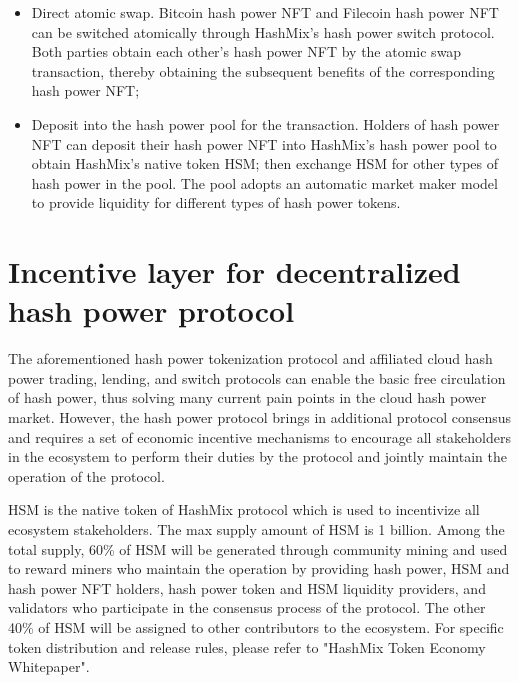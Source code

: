 \documentclass[]{template/llncs}
\begin{document}
\begin{itemize}
	\item Direct atomic swap. Bitcoin hash power NFT and Filecoin hash power NFT can be switched atomically through HashMix's hash power switch protocol. Both parties obtain each other's hash power NFT by the atomic swap transaction, thereby obtaining the subsequent benefits of the corresponding hash power NFT;
	\item Deposit into the hash power pool for the transaction. Holders of hash power NFT can deposit their hash power NFT into HashMix's hash power pool to obtain HashMix's native token HSM; then exchange HSM for other types of hash power in the pool. The pool adopts an automatic market maker model to provide liquidity for different types of hash power tokens.
\end{itemize}

\section{Incentive layer for decentralized hash power protocol}

The aforementioned hash power tokenization protocol and affiliated cloud hash power trading, lending, and switch protocols can enable the basic free circulation of hash power, thus solving many current pain points in the cloud hash power market. However, the hash power protocol brings in additional protocol consensus and requires a set of economic incentive mechanisms to encourage all stakeholders in the ecosystem to perform their duties by the protocol and jointly maintain the operation of the protocol. 

HSM is the native token of HashMix protocol which is used to incentivize all ecosystem stakeholders. The max supply amount of HSM is 1 billion. Among the total supply, 60\% of HSM will be generated through community mining and used to reward miners who maintain the operation by providing hash power, HSM and hash power NFT holders, hash power token and HSM liquidity providers, and validators who participate in the consensus process of the protocol. The other 40\% of HSM will be assigned to other contributors to the ecosystem. For specific token distribution and release rules, please refer to "HashMix Token Economy Whitepaper".
\end{document}
